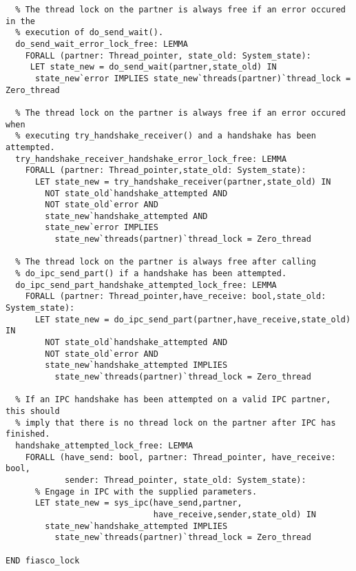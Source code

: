 \begin{lstlisting}
  % The thread lock on the partner is always free if an error occured in the
  % execution of do_send_wait().
  do_send_wait_error_lock_free: LEMMA
    FORALL (partner: Thread_pointer, state_old: System_state):
     LET state_new = do_send_wait(partner,state_old) IN
      state_new`error IMPLIES state_new`threads(partner)`thread_lock = Zero_thread
 
  % The thread lock on the partner is always free if an error occured when 
  % executing try_handshake_receiver() and a handshake has been attempted.
  try_handshake_receiver_handshake_error_lock_free: LEMMA
    FORALL (partner: Thread_pointer,state_old: System_state):
      LET state_new = try_handshake_receiver(partner,state_old) IN
        NOT state_old`handshake_attempted AND 
        NOT state_old`error AND
        state_new`handshake_attempted AND 
        state_new`error IMPLIES
          state_new`threads(partner)`thread_lock = Zero_thread

  % The thread lock on the partner is always free after calling 
  % do_ipc_send_part() if a handshake has been attempted.
  do_ipc_send_part_handshake_attempted_lock_free: LEMMA
    FORALL (partner: Thread_pointer,have_receive: bool,state_old: System_state):
      LET state_new = do_ipc_send_part(partner,have_receive,state_old) IN
        NOT state_old`handshake_attempted AND 
        NOT state_old`error AND
        state_new`handshake_attempted IMPLIES
          state_new`threads(partner)`thread_lock = Zero_thread

  % If an IPC handshake has been attempted on a valid IPC partner, this should
  % imply that there is no thread lock on the partner after IPC has finished.
  handshake_attempted_lock_free: LEMMA
    FORALL (have_send: bool, partner: Thread_pointer, have_receive: bool,
            sender: Thread_pointer, state_old: System_state):
      % Engage in IPC with the supplied parameters.
      LET state_new = sys_ipc(have_send,partner,
                              have_receive,sender,state_old) IN
        state_new`handshake_attempted IMPLIES 
          state_new`threads(partner)`thread_lock = Zero_thread
         
END fiasco_lock
\end{lstlisting}
